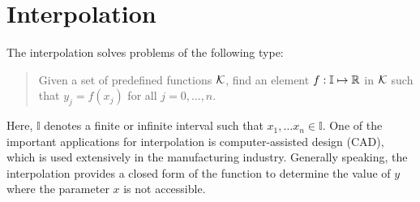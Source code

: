 \chapter{Interpolation}
\label{Ch: 2-Int}

The interpolation solves problems of the following type:

\begin{quotation}
    Given a set of predefined functions $\mathcal K$, find an element $f: \mathbb{I}\mapsto \mathbb R$ in $\mathcal K$ such that
    $y_j = f(x_j)$ for all $j=0,\dots, n$.
\end{quotation}
Here, $\mathbb{I}$ denotes a finite or infinite interval such that $x_1,\dots x_n\in \mathbb{I}$. One of the important applications for interpolation is computer-assisted design (CAD), which is used extensively in the manufacturing industry. Generally speaking, the interpolation provides a closed form of the function to determine the value of $y$ where the parameter $x$ is not accessible.

